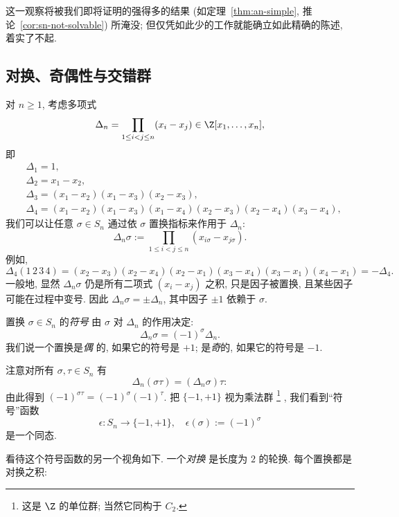 这一观察将被我们即将证明的强得多的结果 (如定理~\ref{thm:an-simple}, 推论~\ref{cor:sn-not-solvable}) 所淹没; 但仅凭如此少的工作就能确立如此精确的陈述, 着实了不起.

\subsection{对换、奇偶性与交错群}
\label{subsec:transpositions}

对 $n \geq 1$, 考虑多项式
\[
\Delta_n = \prod_{1 \leq i < j \leq n} (x_i - x_j) \in \Z[x_1,\dots,x_n],
\]
即
\[
\begin{aligned}
&\Delta_1 = 1,\\
&\Delta_2 = x_1 - x_2,\\
&\Delta_3 = (x_1 - x_2)(x_1 - x_3)(x_2 - x_3),\\
&\Delta_4 = (x_1 - x_2)(x_1 - x_3)(x_1 - x_4)(x_2 - x_3)(x_2 - x_4)(x_3 - x_4),
\end{aligned}
\]
我们可以让任意 $\sigma \in S_n$ 通过依 $\sigma$ 置换指标来作用于 $\Delta_n$:
\[
\Delta_n\sigma := \prod_{1 \leq i < j \leq n} (x_{i\sigma} - x_{j\sigma}).
\]
例如,
\[
\Delta_4(1\,2\,3\,4) = (x_2 - x_3)(x_2 - x_4)(x_2 - x_1)(x_3 - x_4)(x_3 - x_1)(x_4 - x_1) = -\Delta_4.
\]
一般地, 显然 $\Delta_n\sigma$ 仍是所有二项式 $(x_i - x_j)$ 之积, 只是因子被置换, 且某些因子可能在过程中变号. 因此 $\Delta_n\sigma = \pm\Delta_n$, 其中因子 $\pm 1$ 依赖于 $\sigma$.

\begin{definition}
\label{def:sign}
置换 $\sigma \in S_n$ 的\emph{符号}%
由 $\sigma$ 对 $\Delta_n$ 的作用决定:
\[
\Delta_n\sigma = (-1)^\sigma \Delta_n.
\]
我们说一个置换是\emph{偶}%
%
的, 如果它的符号是 $+1$; 是\emph{奇}的, 如果它的符号是 $-1$.
\end{definition}

注意对所有 $\sigma, \tau \in S_n$ 有
\[
\Delta_n(\sigma\tau) = (\Delta_n\sigma)\tau:
\]
由此得到 $(-1)^{\sigma\tau} = (-1)^\sigma(-1)^\tau$. 把 $\{-1,+1\}$ 视为乘法群%
\footnote{这是 $\Z$ 的单位群; 当然它同构于 $C_2$.}%
, 我们看到``符号''函数
\[
\epsilon : S_n \to \{-1,+1\},\quad \epsilon(\sigma) := (-1)^\sigma
\]
是一个同态.

看待这个符号函数的另一个视角如下. 一个\emph{对换}%
是长度为 $2$ 的轮换. 每个置换都是对换之积:

